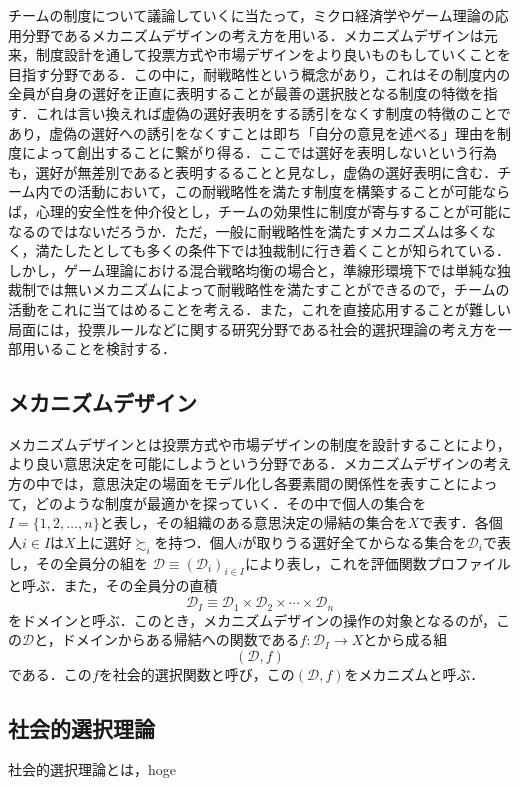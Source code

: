 \documentclass[a4paper, 11pt]{jsarticle}
\begin{document}
チームの制度について議論していくに当たって，ミクロ経済学やゲーム理論の応用分野であるメカニズムデザインの考え方を用いる．メカニズムデザインは元来，制度設計を通して投票方式や市場デザインをより良いものもしていくことを目指す分野である．この中に，耐戦略性という概念があり，これはその制度内の全員が自身の選好を正直に表明することが最善の選択肢となる制度の特徴を指す．これは言い換えれば虚偽の選好表明をする誘引をなくす制度の特徴のことであり，虚偽の選好への誘引をなくすことは即ち「自分の意見を述べる」理由を制度によって創出することに繋がり得る．ここでは選好を表明しないという行為も，選好が無差別であると表明するることと見なし，虚偽の選好表明に含む．チーム内での活動において，この耐戦略性を満たす制度を構築することが可能ならば，心理的安全性を仲介役とし，チームの効果性に制度が寄与することが可能になるのではないだろうか．ただ，一般に耐戦略性を満たすメカニズムは多くなく，満たしたとしても多くの条件下では独裁制に行き着くことが知られている．しかし，ゲーム理論における混合戦略均衡の場合と，準線形環境下では単純な独裁制では無いメカニズムによって耐戦略性を満たすことができるので，チームの活動をこれに当てはめることを考える．また，これを直接応用することが難しい局面には，投票ルールなどに関する研究分野である社会的選択理論の考え方を一部用いることを検討する．

\subsection{メカニズムデザイン}
メカニズムデザインとは投票方式や市場デザインの制度を設計することにより，より良い意思決定を可能にしようという分野である．メカニズムデザインの考え方の中では，意思決定の場面をモデル化し各要素間の関係性を表すことによって，どのような制度が最適かを探っていく．その中で個人の集合を\(I = \{1,2,\dots,n\}\)と表し，その組織のある意思決定の帰結の集合を\(X\)で表す．各個人\(i \in I\)は\(X\)上に選好\(\succsim_i\)を持つ．個人\(i\)が取りうる選好全てからなる集合を\(\mathscr{D}_i\)で表し，その全員分の組を
\(\mathscr{D} \equiv (\mathscr{D}_i)_{i \in I}\)により表し，これを評価関数プロファイルと呼ぶ．また，その全員分の直積
\[\mathscr{D}_I \equiv \mathscr{D}_1 \times \mathscr{D}_2 \times \cdots \times \mathscr{D}_n\]
をドメインと呼ぶ．このとき，メカニズムデザインの操作の対象となるのが，この\(\mathscr{D}\)と，ドメインからある帰結への関数である\(f: \mathscr{D}_I \rightarrow X\)とから成る組\[(\mathscr{D}, f)\]である．この\(f\)を社会的選択関数と呼び，この\((\mathscr{D}, f)\)をメカニズムと呼ぶ．
\subsection{社会的選択理論}
社会的選択理論とは，hoge
\end{document}
